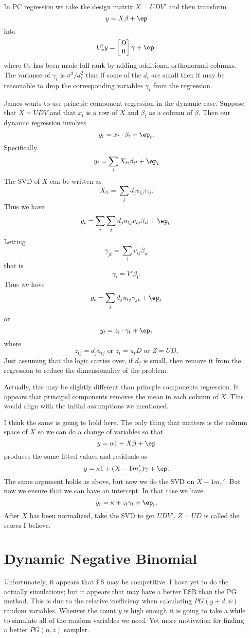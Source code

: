 \documentclass{article}
\begin{document}
In PC regression we take the design matrix $X = U D V'$ and then transform
\[
y = X \beta + \ep
\]
into
\[
U_*' y = 
\begin{bmatrix}
D \\ 0
\end{bmatrix}
\gamma + \ep.
\]
where $U_*$ has been made full rank by adding additional orthonormal columns.
The variance of $\gamma_i$ is $\sigma^2 / d_i^2$ thus if some of the $d_i$ are
small then it may be reasonable to drop the corresponding variables $\gamma_i$
from the regression.

James wants to use princple component regression in the dynamic case.  Suppose
that $X = UDV$ and that $x_t$ is a row of $X$ and $\beta_t$ as a column of
$\beta$.  Then our dynamic regression involves
\[
y_t = x_t \cdot \beta_t + \ep_t.
\]
Specifically
\[
y_t = \sum_{i} X_{ti} \beta_{it} + \ep_t
\]
The SVD of $X$ can be written as
\[
X_{ti} = \sum_{j} d_j u_{tj} v_{ij}.
\]
Thus we have
\[
y_t = \sum_i \sum_j d_j u_{tj} v_{ij} \beta_{it} + \ep_t.
\]
Letting
\[
\gamma_{jt} = \sum_i v_{ij} \beta_{it}
\]
that is
\[
\gamma_t = V' \beta_t.
\]
Thus we have
\[
y_t = \sum_{j} d_j u_{tj} \gamma_{jt} + \ep_t
\]
or
\[
y_t = z_t \cdot \gamma_t + \ep_t
\]
where
\[
z_{tj} = d_j u_{tj} \text{ or } z_t = u_t D \text{ or } Z = UD.
\]
Just assuming that the logic carries over, if $d_j$ is small, then remove it
from the regression to reduce the dimensionality of the problem.

Actually, this may be slightly different than princple components regression.
It appears that principal components removes the mean in each column of $X$.
This would align with the initial assumptions we mentioned.

I think the same is going to hold here.  The only thing that matters is the
column space of $X$ so we can do a change of variables so that
\[
y = \alpha 1 + X \beta + \ep
\]
produces the same fitted values and residuals as
\[
y = \kappa 1 + (X - 1 m_x') \gamma + \ep.
\]
The same argument holds as above, but now we do the SVD on $X- 1 m_x'$.  But now
we ensure that we can have an intercept.  In that case we have
\[
y_t = \kappa + z_t \gamma_t + \ep_t.
\]
After $X$ has been normalized, take the SVD to get $UDV'$.  $Z=UD$ is called the
scores I believe.

\section{Dynamic Negative Binomial}

Unfortunately, it appears that FS may be competitive.  I have yet to do the
actually simulations; but it appears that \cite{fruthwirth-schnatter-etal-2009}
may have a better ESR than the PG method.  This is due to the relative
inefficieny when calculating $PG(y+d, \psi)$ random variables.  Whenver the
count $y$ is high enough it is going to take a while to simulate all of the
random variables we need.  Yet more motivation for finding a better $PG(n, z)$
sampler.
\end{document}
